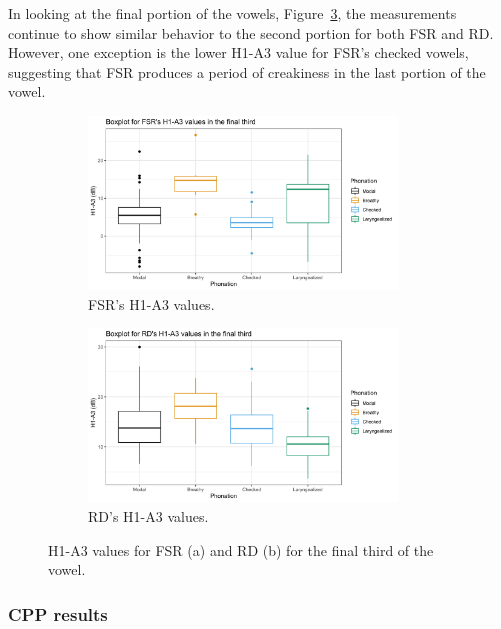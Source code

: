 \documentclass[12pt, letterpaper]{article}
\begin{document}
In looking at the final portion of the vowels, Figure~\ref{fig:h1a3third}, the measurements continue to show similar behavior to the second portion for both FSR and RD. However, one exception is the lower H1-A3 value for FSR's checked vowels, suggesting that FSR produces a period of creakiness in the last portion of the vowel.

\begin{figure}[!ht]
	\centering
	\begin{subfigure}{.5\textwidth}
		\centering
		\includegraphics[width=0.9\textwidth]{../mean_FSR_h1a3_third.png}
		\caption{FSR's H1-A3 values.}
		\label{fig:FSRh1a3third} 
	\end{subfigure}%
	\begin{subfigure}{.5\textwidth}
		\centering
		\includegraphics[width=0.9\textwidth]{../mean_RD_h1a3_third.png}
		\caption{RD's H1-A3 values.}
		\label{fig:RDh1a3third} 
	\end{subfigure}
	\caption{H1-A3 values for FSR (a) and RD (b) for the final third of the vowel. }
	\label{fig:h1a3third}
\end{figure}

\subsubsection{CPP results} \label{sec:CPP}
\end{document}
